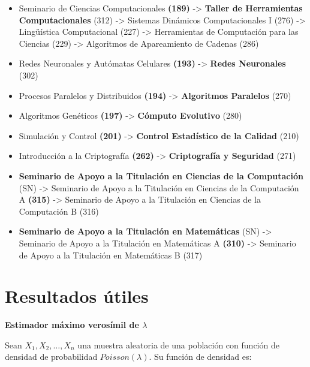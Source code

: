 \begin{appendices}
\begin{itemize}
  \item Seminario de Ciencias Computacionales \textbf{(189)} -> \textbf{Taller de Herramientas Computacionales} (312) -> Sistemas Dinámicos Computacionales I (276) -> Lingüística Computacional (227) -> Herramientas de Computación para las Ciencias (229) -> Algoritmos de Apareamiento de Cadenas (286)
  
  \item Redes Neuronales y Autómatas Celulares \textbf{(193)} -> \textbf{Redes Neuronales} (302)
  
  \item Procesos Paralelos y Distribuidos \textbf{(194)} -> \textbf{Algoritmos Paralelos} (270)
  
  \item Algoritmos Genéticos \textbf{(197)} -> \textbf{Cómputo Evolutivo} (280)
  
  \item Simulación y Control \textbf{(201)} -> \textbf{Control Estadístico de la Calidad} (210)
  
  \item Introducción a la Criptografía \textbf{(262)} -> \textbf{Criptografía y Seguridad} (271)
  
  \item \textbf{Seminario de Apoyo a la Titulación en Ciencias de la Computación} (SN) -> Seminario de Apoyo a la Titulación en Ciencias de la Computación A \textbf{(315)} -> Seminario de Apoyo a la Titulación en Ciencias de la Computación B (316)
  
  \item \textbf{Seminario de Apoyo a la Titulación en Matemáticas} (SN) -> Seminario de Apoyo a la Titulación en Matemáticas A \textbf{(310)} -> Seminario de Apoyo a la Titulación en Matemáticas B (317)
  \end{itemize}%



\chapter{Resultados útiles} %

\begin{defn} \label{EMVlambda}
\textbf{Estimador máximo verosímil de $\lambda$}

Sean $X_{1}, X_{2}, \ldots, X_{n}$ una muestra aleatoria de una población con función de densidad de probabilidad $Poisson(\lambda)$. Su función de densidad es:


\end{defn}
\end{appendices}
